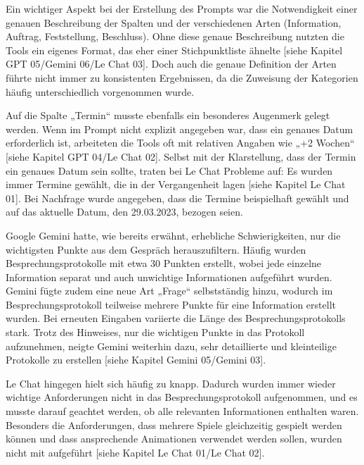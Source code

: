 Ein wichtiger Aspekt bei der Erstellung des Prompts war die Notwendigkeit einer genauen Beschreibung der Spalten 
und der verschiedenen Arten (Information, Auftrag, Feststellung, Beschluss). Ohne diese genaue Beschreibung nutzten 
die Tools ein eigenes Format, das eher einer Stichpunktliste ähnelte [siehe Kapitel GPT 05/Gemini 06/Le Chat 03]. 
Doch auch die genaue Definition der Arten führte nicht immer zu konsistenten Ergebnissen, da die Zuweisung der Kategorien 
häufig unterschiedlich vorgenommen wurde.

Auf die Spalte „Termin“ musste ebenfalls ein besonderes Augenmerk gelegt werden. Wenn im Prompt nicht explizit 
angegeben war, dass ein genaues Datum erforderlich ist, arbeiteten die Tools oft mit relativen Angaben wie „+2 Wochen“ 
[siehe Kapitel GPT 04/Le Chat 02]. Selbst mit der Klarstellung, dass der Termin ein genaues Datum sein sollte, traten 
bei Le Chat Probleme auf: Es wurden immer Termine gewählt, die in der Vergangenheit lagen [siehe Kapitel Le Chat 01]. 
Bei Nachfrage wurde angegeben, dass die Termine beispielhaft gewählt und auf das aktuelle Datum, den 29.03.2023, 
bezogen seien.

Google Gemini hatte, wie bereits erwähnt, erhebliche Schwierigkeiten, nur die wichtigsten Punkte aus dem Gespräch 
herauszufiltern. Häufig wurden Besprechungsprotokolle mit etwa 30 Punkten erstellt, wobei jede einzelne Information 
separat und auch unwichtige Informationen aufgeführt wurden. Gemini fügte zudem eine neue Art „Frage“ selbstständig 
hinzu, wodurch im Besprechungsprotokoll teilweise mehrere Punkte für eine Information erstellt wurden. Bei erneuten 
Eingaben variierte die Länge des Besprechungsprotokolls stark. Trotz des Hinweises, nur die wichtigen Punkte in das 
Protokoll aufzunehmen, neigte Gemini weiterhin dazu, sehr detaillierte und kleinteilige Protokolle zu erstellen 
[siehe Kapitel Gemini 05/Gemini 03].

Le Chat hingegen hielt sich häufig zu knapp. Dadurch wurden immer wieder wichtige Anforderungen nicht in das 
Besprechungsprotokoll aufgenommen, und es musste darauf geachtet werden, ob alle relevanten Informationen enthalten 
waren. Besonders die Anforderungen, dass mehrere Spiele gleichzeitig gespielt werden können und dass ansprechende 
Animationen verwendet werden sollen, wurden nicht mit aufgeführt [siehe Kapitel Le Chat 01/Le Chat 02].

